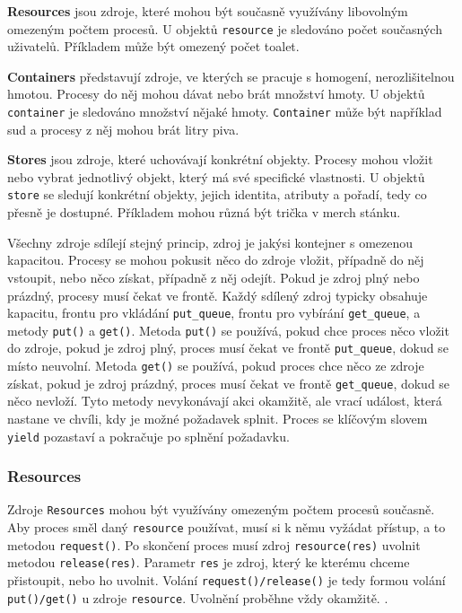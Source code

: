 \documentclass[
  program=itp,
  biblatex,
  figures=false,
  glossaries,
  index
]{kidiplom}
\begin{document}
\noindent \textbf{Resources} jsou zdroje, které mohou být současně využívány libovolným omezeným počtem procesů. U objektů \texttt{resource} je sledováno počet současných uživatelů. Příkladem může být omezený počet toalet.

\noindent \textbf{Containers} představují zdroje, ve kterých se pracuje s homogení, nerozlišitelnou hmotou. Procesy do něj mohou dávat nebo brát množství hmoty. U objektů \texttt{container} je sledováno množství nějaké hmoty. \texttt{Container} může být například sud a procesy z něj mohou brát litry piva. 

\noindent \textbf{Stores} jsou zdroje, které uchovávají konkrétní objekty. Procesy mohou vložit nebo vybrat jednotlivý objekt, který má své specifické vlastnosti. U objektů \texttt{store} se sledují konkrétní objekty, jejich identita, atributy a pořadí, tedy co přesně je dostupné. Příkladem mohou různá být trička v merch stánku.

Všechny zdroje sdílejí stejný princip, zdroj je jakýsi kontejner s omezenou kapacitou. Procesy se mohou pokusit něco do zdroje vložit, případně do něj vstoupit, nebo něco získat, případně z něj odejít. Pokud je zdroj plný nebo prázdný, procesy musí čekat ve frontě. Každý sdílený zdroj typicky obsahuje kapacitu, frontu pro vkládání \texttt{put\_queue}, frontu pro vybírání \texttt{get\_queue}, a metody \texttt{put()} a \texttt{get()}. Metoda \texttt{put()} se používá, pokud chce proces něco vložit do zdroje, pokud je zdroj plný, proces musí čekat ve frontě \texttt{put\_queue}, dokud se místo neuvolní. Metoda \texttt{get()} se používá, pokud proces chce něco ze zdroje získat, pokud je zdroj prázdný, proces musí čekat ve frontě \texttt{get\_queue}, dokud se něco nevloží. Tyto metody nevykonávají akci okamžitě, ale vrací událost, která nastane ve chvíli, kdy je možné požadavek splnit. Proces se klíčovým slovem \texttt{yield} pozastaví a pokračuje po splnění požadavku.

\subsubsection{Resources}
Zdroje \texttt{Resources} mohou být využívány omezeným počtem procesů současně. Aby proces směl daný \texttt{resource} používat, musí si k němu vyžádat přístup, a to metodou \texttt{request()}. Po skončení proces musí zdroj \texttt{resource(res)} uvolnit metodou \texttt{release(res)}. Parametr \texttt{res} je zdroj, který ke kterému chceme přistoupit, nebo ho uvolnit. Volání \texttt{request()/release()} je tedy formou volání \texttt{put()/get()} u zdroje \texttt{resource}. Uvolnění proběhne vždy okamžitě. .
\end{document}
